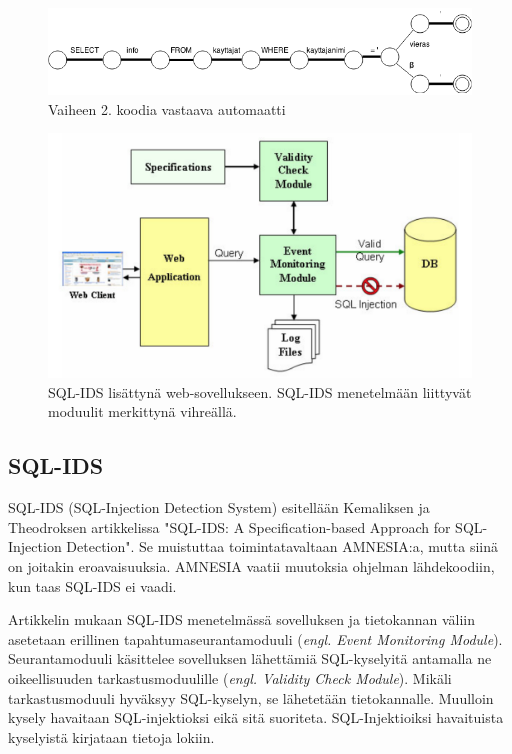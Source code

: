 \documentclass[finnish]{tktltiki2}
\theoremstyle{definition}
\theoremstyle{remark}
\begin{document}
		\begin{figure}[h!]
		\caption{Vaiheen 2. koodia vastaava automaatti}
		\includegraphics[scale=0.5]{kandi}
		\end{figure}

		\begin{figure}[b!]
			\caption{SQL-IDS lisättynä web-sovellukseen. SQL-IDS menetelmään liittyvät moduulit merkittynä vihreällä. \cite{sqlids}}
			\includegraphics[scale=0.55]{sqlids}
		\end{figure}
		
	\subsection{SQL-IDS}
	SQL-IDS (SQL-Injection Detection System) esitellään Kemaliksen ja Theodroksen artikkelissa "SQL-IDS: A Specification-based Approach for SQL-Injection Detection"\space\cite{sqlids}. Se muistuttaa toimintatavaltaan AMNESIA:a, mutta siinä on joitakin eroavaisuuksia. AMNESIA vaatii muutoksia ohjelman lähdekoodiin, kun taas SQL-IDS ei vaadi.
	
	Artikkelin mukaan SQL-IDS menetelmässä sovelluksen ja tietokannan väliin asetetaan erillinen tapahtumaseurantamoduuli (\textit{engl. Event Monitoring Module}). Seurantamoduuli käsittelee sovelluksen lähettämiä SQL-kyselyitä antamalla ne oikeellisuuden tarkastusmoduulille (\textit{engl. Validity Check Module}). Mikäli tarkastusmoduuli hyväksyy SQL-kyselyn, se lähetetään tietokannalle. Muulloin kysely havaitaan SQL-injektioksi eikä sitä suoriteta. SQL-Injektioiksi havaituista kyselyistä kirjataan tietoja lokiin.
	
\end{document}
